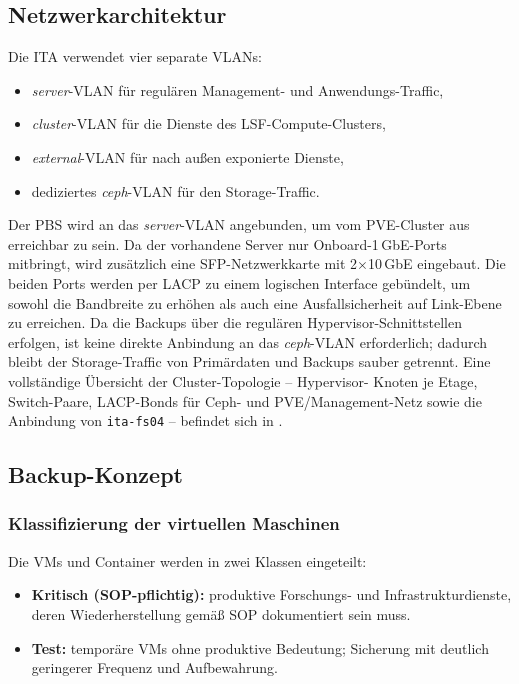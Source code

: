 \subsection{Netzwerkarchitektur}
\label{sec:Netzwerk}
Die \ac{ITA} verwendet vier separate \acp{VLAN}:
\begin{itemize}
    \item \emph{server}-\ac{VLAN} für regulären Management- und
          Anwendungs-Traffic,
    \item \emph{cluster}-\ac{VLAN} für die Dienste des
          \ac{LSF}-Compute-Clusters,
    \item \emph{external}-\ac{VLAN} für nach außen exponierte Dienste,
    \item dediziertes \emph{ceph}-\ac{VLAN} für den Storage-Traffic.
\end{itemize}
Der \ac{PBS} wird an das \emph{server}-\ac{VLAN} angebunden, um vom
\ac{PVE}-Cluster aus erreichbar zu sein.
Da der vorhandene Server nur Onboard-1\,GbE-Ports mitbringt, wird
zusätzlich eine \ac{SFP}-Netzwerkkarte mit 2$\times$10\,GbE eingebaut.
Die beiden Ports werden per \ac{LACP} zu einem logischen Interface
gebündelt, um sowohl die Bandbreite zu erhöhen als auch eine
Ausfallsicherheit auf Link-Ebene zu erreichen.
Da die Backups über die regulären Hypervisor-Schnittstellen erfolgen,
ist keine direkte Anbindung an das \emph{ceph}-\ac{VLAN} erforderlich;
dadurch bleibt der Storage-Traffic von Primärdaten und Backups
sauber getrennt.
Eine vollständige Übersicht der Cluster-Topologie -- Hypervisor-
Knoten je Etage, Switch-Paare, \ac{LACP}-Bonds für Ceph- und
\ac{PVE}/Management-Netz sowie die Anbindung von
\texttt{ita-fs04} -- befindet sich in
.


\subsection{Backup-Konzept}
\label{sec:Backupkonzept}

\subsubsection*{Klassifizierung der virtuellen Maschinen}
Die \acp{VM} und Container werden in zwei Klassen eingeteilt:
\begin{itemize}
    \item \textbf{Kritisch (\ac{SOP}-pflichtig):} produktive
          Forschungs- und Infrastrukturdienste, deren Wiederherstellung
          gemäß \acl{SOP} dokumentiert sein muss.
    \item \textbf{Test:} temporäre \acp{VM} ohne produktive Bedeutung;
          Sicherung mit deutlich geringerer Frequenz und Aufbewahrung.
\end{itemize}

